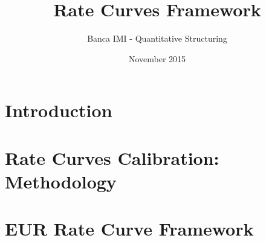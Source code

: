 \documentclass[11pt,twoside]{report}
\title{Rate Curves Framework}
\author{Banca IMI - Quantitative Structuring}
\date{November 2015}
\begin{document}
\maketitle

\tableofcontents

\chapter{Introduction}\label{chap:1}


\chapter{Rate Curves Calibration: Methodology}\label{chap:2}


\chapter{EUR Rate Curve Framework}\label{chap:4}


%

%

\printbibliography
\end{document}
